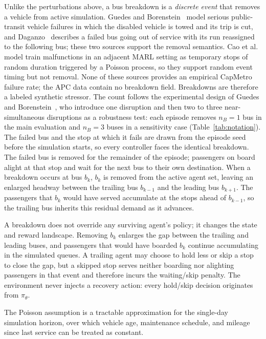 Unlike the perturbations above, a bus breakdown is a \textit{discrete event} that removes a vehicle from active simulation. Guedes and Borenstein~\cite{Guedes2018Rescheduling} model serious public-transit vehicle failures in which the disabled vehicle is towed and its trip is cut, and Daganzo~\cite{Daganzo2009} describes a failed bus going out of service with its run reassigned to the following bus; these two sources support the removal semantics. Cao et al.~\cite{Cao2022Train} model train malfunctions in an adjacent MARL setting as temporary stops of random duration triggered by a Poisson process, so they support random event timing but not removal. None of these sources provides an empirical CapMetro failure rate; the APC data contain no breakdown field. Breakdowns are therefore a labeled synthetic stressor. The count follows the experimental design of Guedes and Borenstein~\cite{Guedes2018Rescheduling}, who introduce one disruption and then two to three near-simultaneous disruptions as a robustness test: each episode removes $n_B = 1$ bus in the main evaluation and $n_B = 3$ buses in a sensitivity case (Table~\ref{tab:notation}). The failed bus and the stop at which it fails are drawn from the episode seed before the simulation starts, so every controller faces the identical breakdown. The failed bus is removed for the remainder of the episode; passengers on board alight at that stop and wait for the next bus to their own destination. When a breakdown occurs at bus $b_k$, $b_k$ is removed from the active agent set, leaving an enlarged headway between the trailing bus $b_{k-1}$ and the leading bus $b_{k+1}$. The passengers that $b_k$ would have served accumulate at the stops ahead of $b_{k-1}$, so the trailing bus inherits this residual demand as it advances.

A breakdown does not override any surviving agent's policy; it changes the state and reward landscape. Removing $b_k$ enlarges the gap between the trailing and leading buses, and passengers that would have boarded $b_k$ continue accumulating in the simulated queues. A trailing agent may choose to hold less or skip a stop to close the gap, but a skipped stop serves neither boarding nor alighting passengers in that event and therefore incurs the waiting/skip penalty. The environment never injects a recovery action: every hold/skip decision originates from $\pi_\theta$.

The Poisson assumption is a tractable approximation for the single-day simulation horizon, over which vehicle age, maintenance schedule, and mileage since last service can be treated as constant.



